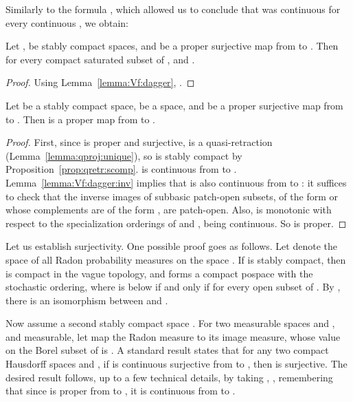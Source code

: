 \documentclass{LMCS}
\begin{document}
Similarly to the formula , which allowed us to conclude that  was
continuous for every continuous , we obtain:
\begin{lem}
  \label{lemma:Vf:dagger:inv}
  Let ,  be stably compact spaces, and  be a proper
  surjective map from  to .  Then  for every
  compact saturated subset  of , and .
\end{lem}
\begin{proof}
  Using Lemma~\ref{lemma:Vf:dagger}, .
\end{proof}

\begin{prop}
  \label{prop:Vf:proper}
  Let  be a stably compact space,  be a  space, and  be
  a proper surjective map from  to .  Then  is
  a proper map from  to .
\end{prop}
\begin{proof}
  First, since  is proper and surjective,  is a quasi-retraction
  (Lemma~\ref{lemma:qproj:unique}), so  is stably compact by
  Proposition~\ref{prop:qretr:scomp}.   is
  continuous from  to .
  Lemma~\ref{lemma:Vf:dagger:inv} implies that  is
  also continuous from  to : it suffices to check that the inverse images of
  subbasic patch-open subsets, of the form  or whose
  complements are of the form , are
  patch-open.  Also,  is monotonic with respect to
  the specialization orderings of  and , being continuous.  So  is proper.
\end{proof}

Let us establish surjectivity.  One possible proof goes as follows.
Let  denote the space of all Radon probability
measures on the space .  If  is stably compact, then  is compact in the vague topology, and forms a compact
pospace with the stochastic ordering, where  is below  if
and only if  for every open subset  of 
\cite[Theorem~31]{AMJK:scs:prob}.  By
\cite[Theorem~36]{AMJK:scs:prob}, there is an isomorphism between
 and .

Now assume a second stably compact space .  For two measurable
spaces  and , and  measurable, let 
map the Radon measure  to its image measure, whose value on the
Borel subset  of  is .  A standard result
\cite[2.4, Lemma~1]{Bourbaki:int:IX} states that for any two compact
Hausdorff spaces  and , if  is continuous surjective from 
to , then  is surjective.  The desired result
follows, up to a few technical details, by taking ,
, remembering that since  is proper from  to , it
is continuous from  to .
\end{document}

